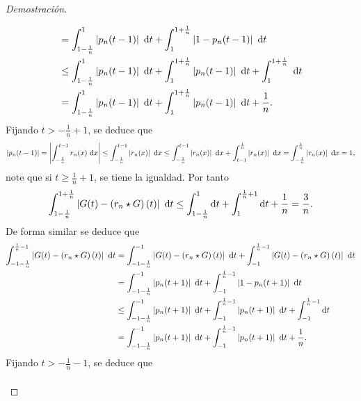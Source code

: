\documentclass[10pt,a4paper]{report}
\newcommand{\abs}[2][y]{\if#1y\left\fi\lvert#2\if#1y\right\fi\rvert}
\theoremstyle{definition}
\renewcommand{\theproblem}{\Alph{problem}}
\numberwithin{equation}{problem}
\providecommand{\abs}[1]{\left\lvert#1\right\rvert}
\begin{document}
\begin{proof}[\textcolor{rojo}{Demostración}]
\begin{enumerate}[label=\textbf{\theproblem.\arabic{*}.},ref=\theproblem.\arabic{*},parsep=1ex]
\begin{align*}
              	&= \int_{1-\frac{1}{n}}^{1}\abs{p_{n}(t-1)}\ \text{d}t + \int_{1}^{1+\frac{1}{n}}\abs{1-p_{n}(t-1)}\ \text{d}t\\
              	&\leq \int_{1-\frac{1}{n}}^{1}\abs{p_{n}(t-1)}\ \text{d}t + \int_{1}^{1+\frac{1}{n}}\abs{p_{n}(t-1)}\ \text{d}t +  \int_{1}^{1+\frac{1}{n}}\ \text{d}t\\
              	&= \int_{1-\frac{1}{n}}^{1}\abs{p_{n}(t-1)}\ \text{d}t + \int_{1}^{1+\frac{1}{n}}\abs{p_{n}(t-1)}\ \text{d}t + \frac{1}{n}.
              \end{align*}
              Fijando $t>-\frac{1}{n}+1$, se deduce que
              \begin{align*}
              	\abs{p_{n}(t-1)} = \abs{\int_{-\frac{1}{n}}^{t-1}r_{n}(x)\ \text{d}x}\leq \int_{-\frac{1}{n}}^{t-1}\abs{r_{n}(x)}\ \text{d}x \leq  \int_{-\frac{1}{n}}^{t-1}\abs{r_{n}(x)}\ \text{d}x + \int_{t-1}^{\frac{1}{n}}\abs{r_{n}(x)}\ \text{d}x = \int_{-\frac{1}{n}}^{\frac{1}{n}}\abs{r_{n}(x)}\ \text{d}x = 1,
              \end{align*}
              note que si $t\geq\frac{1}{n}+1$, se tiene la igualdad. Por tanto
              \begin{align*}
              	\int_{1-\frac{1}{n}}^{1+\frac{1}{n}}\abs{G(t)-\left(r_{n}\star G\right)(t)}\ \text{d}t\leq \int_{1-\frac{1}{n}}^{1}\text{d}t + \int_{1}^{\frac{1}{n}+1}\text{d}t + \frac{1}{n} = \frac{3}{n}.
              \end{align*}
              De forma similar se deduce que 
              \begin{align*}
              	\int_{-1-\frac{1}{n}}^{\frac{1}{n}-1}\abs{G(t)-\left(r_{n}\star G\right)(t)}\ \text{d}t &= \int_{-1-\frac{1}{n}}^{-1}\abs{G(t)-\left(r_{n}\star G\right)(t)}\ \text{d}t + \int_{-1}^{\frac{1}{n}-1}\abs{G(t)-\left(r_{n}\star G\right)(t)}\ \text{d}t\\
              	&= \int_{-1-\frac{1}{n}}^{-1}\abs{p_{n}(t+1)}\ \text{d}t + \int_{-1}^{\frac{1}{n}-1}\abs{1-p_{n}(t+1)}\ \text{d}t\\
              	&\leq \int_{-1-\frac{1}{n}}^{-1}\abs{p_{n}(t+1)}\ \text{d}t + \int_{-1}^{\frac{1}{n}-1}\abs{p_{n}(t+1)}\ \text{d}t + \int_{-1}^{\frac{1}{n}-1} \text{d}t\\
              	&= \int_{-1-\frac{1}{n}}^{-1}\abs{p_{n}(t+1)}\ \text{d}t + \int_{-1}^{\frac{1}{n}-1}\abs{p_{n}(t+1)}\ \text{d}t + \frac{1}{n}.
              \end{align*}
              Fijando $t>-\frac{1}{n}-1$, se deduce que
              \begin{align*}

\end{align*}
\end{enumerate}
\end{proof}
\end{document}
